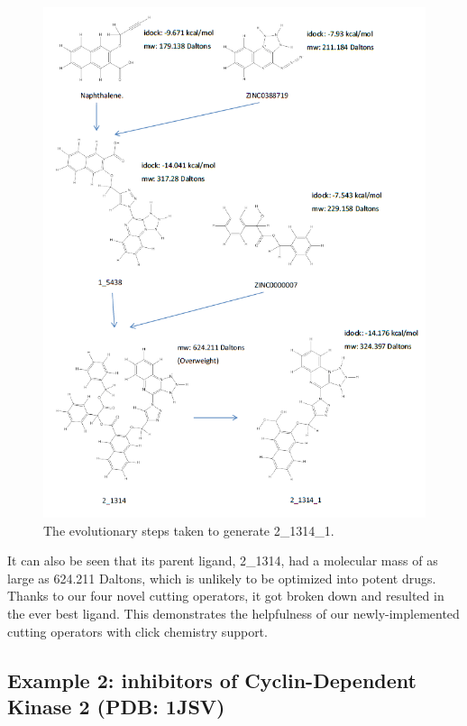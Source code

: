 \begin{figure}
\begin{center}
\includegraphics[width=\linewidth]{../isyn/2_1314_1.png}
\end{center}
\caption{The evolutionary steps taken to generate 2\_1314\_1.}
\label{fig:2_1314_1}
\end{figure}

It can also be seen that its parent ligand, 2\_1314, had a molecular mass of as large as 624.211 Daltons, which is unlikely to be optimized into potent drugs. Thanks to our four novel cutting operators, it got broken down and resulted in the ever best ligand. This demonstrates the helpfulness of our newly-implemented cutting operators with click chemistry support.

\subsection{Example 2: inhibitors of Cyclin-Dependent Kinase 2 (PDB: 1JSV)}

